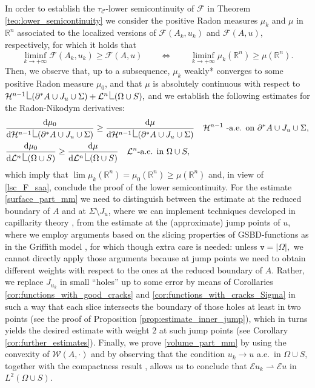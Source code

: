 \documentclass[reqno]{amsart}
\numberwithin{equation}{section}
\theoremstyle{plain}
\theoremstyle{definition}
\newcommand{\R}{\mathbb{R}}
\newcommand{\fm}{\mathtt{v}}
\newcommand{\cH}{\mathcal{H}}
\newcommand{\cL}{\mathcal{L}}
\newcommand{\cF}{\mathcal{F}}
\newcommand{\cW}{\mathcal{W}}
\newcommand{\p}{\partial}
\newcommand{\wk}{\rightharpoonup}
\renewcommand{\d}{\mathrm{d}}
\newcommand{\res}{\mathop{\hbox{\vrule height 9pt width 0.5pt depth 0pt
\vrule height 0.5pt width 5pt depth 0pt}}\nolimits}
\newcommand{\str}[1]{\mathcal{E}#1}
\newcommand{\admissible}{\mathcal{C}}
\begin{document}
In order to establish the $\tau_\admissible$-lower semicontinuity of $\cF$ in Theorem \ref{teo:lower_semicontinuity} we consider the positive Radon measures  $\mu_k$ and $\mu$  in $\R^n$ associated to the localized versions of $\cF(A_k,u_k)$ and $\cF(A,u)$, respectively, for which it holds that
\begin{equation}\label{lsc_F_saa}
\liminf\limits_{k\to+\infty} \cF(A_k,u_k) \ge \cF(A,u)\qquad\Longleftrightarrow\qquad \liminf\limits_{k\to+\infty} \mu_k(\R^n) \ge \mu(\R^n).
\end{equation}
 Then, we observe that, up to a subsequence, $\mu_k$ weakly* converges to some positive Radon measure $\mu_0$, and that $\mu$ is absolutely continuous with respect to $\cH^{n-1}\res (\p^*A\cup J_u\cup \Sigma) + \cL^n\res(\Omega\cup S),$  and we establish the following estimates for the Radon-Nikodym derivatives:
\begin{align}
& \frac{\d\mu_0}{\d\cH^{n-1}\res(\p^*A\cup J_u\cup \Sigma)} \ge \frac{\d\mu}{\d\cH^{n-1}\res(\p^*A\cup J_u\cup \Sigma)} \quad  \text{$\cH^{n-1}$ -a.e. on $\p^*A\cup J_u\cup \Sigma,$}\label{surface_part_mm}\\
%
&\frac{\d\mu_0}{\d\cL^n \res(\Omega\cup S)} \ge \frac{\d\mu}{\d\cL^n \res(\Omega\cup S)} \quad  \text{$\cL^n$-a.e. in $\Omega\cup S,$} \label{volume_part_mm}
\end{align}
which imply that
$
\lim \mu_k(\R^n) = \mu_0(\R^n) \ge \mu(\R^n)  
$
and, in view of \eqref{lsc_F_saa}, conclude the proof of the lower semicontinuity. For the estimate \eqref{surface_part_mm} we need to distinguish between  the estimate at the reduced boundary of $A$ and at $\Sigma\setminus J_u$, where we can implement techniques developed in capillarity theory \cite{ADT:2017,DPhM:2015}, from the  estimate at the (approximate) jump points of $u$, where we employ arguments based on the slicing properties of GSBD-functions as in the Griffith model \cite{ChC:2019_arxiv,ChC:2020_jems,ChC:2020_arxiv}, for  which though extra care is needed: unless $\fm=|\Omega|,$ we cannot directly apply those arguments because at jump points we need to obtain different weights with respect to the ones at the reduced boundary of $A.$ Rather, we replace $J_{u_k}$ in small ``holes'' up to some error by means of Corollaries \ref{cor:functions_with_good_cracks} and \ref{cor:functions_with_cracks_Sigma}  in such a way that each slice   intersects  the boundary of those holes at least in  two points (see the proof of Proposition \ref{prop:estimate_inner_jump}),  which in turns yields the desired estimate with weight $2$ at such  jump points (see Corollary \ref{cor:further_estimates}). Finally, we prove  \eqref{volume_part_mm} by using the convexity of $\cW(A,\cdot)$ and by observing that the condition $u_k\to u$ a.e.\ in $\Omega\cup S,$ together with the compactness result \cite[Theorem 1.1]{ChC:2020_jems}, allows us to conclude  that $\str{u_k} \wk \str{u}$ in $L^2(\Omega\cup S)$.
\end{document}
